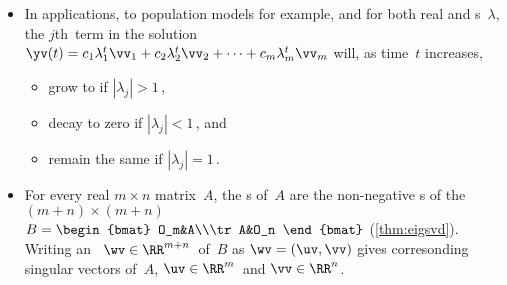 \begin{itemize}
\itemme Suppose the \(n\times n\) ~\(A\) governs the dynamics of \(\yv(t)\in\RR^n\) according to \(\yv(t+1)=A\yv(t)\) (\autoref{thm:dynsol}).
\begin{itemize}
\item Let \hlist\lambda m\ be s of~\(A\) and \hlist\vv m\ be corresponding s, then a solution of \(\yv(t+1)=A\yv(t)\) is the 
\begin{equation*}
\yv(t)=c_1\lambda_1^t\vv_1+c_2\lambda_2^t\vv_2+\cdots+c_m\lambda_m^t\vv_m
\end{equation*}
for all constants \hlist cm.

\sloppy
\item Further, if the number of eigenvectors \(m=n\) (the size of~\(A\)), and the matrix of eigenvectors \(P=\begin{bmatrix} \vv_1&\vv_2&\cdots&\vv_n \end{bmatrix}\) is , then the general  is a  in that unique constants \hlist cn\ may be found for every given ~\(\yv(0)\).
\end{itemize}

\item In applications, to population models for example, and for both real and s~\(\lambda\), the \(j\)th~term in the solution \(\yv(t)=c_1\lambda_1^t\vv_1+c_2\lambda_2^t\vv_2+\cdots+c_m\lambda_m^t\vv_m\) will, as time~\(t\) increases,
\begin{itemize}
\item grow to  if \(|\lambda_j|>1\)\,,
\item decay to zero if \(|\lambda_j|<1\)\,, and
\item remain the same  if \(|\lambda_j|=1\)\,.
\end{itemize}


\item For every real \(m\times n\) matrix~\(A\), the s of~\(A\) are the non-negative s of the \((m+n)\times(m+n)\)  \(B=\begin{bmat} O_m&A\\\tr A&O_n \end{bmat}\) (\autoref{thm:eigsvd}). 
Writing an ~\(\wv\in\RR^{m+n}\)\ of~\(B\) as \(\wv=(\uv,\vv)\) gives corresonding singular vectors of~\(A\), \(\uv\in\RR^m\)\ and \(\vv\in\RR^n\).



\end{itemize}
